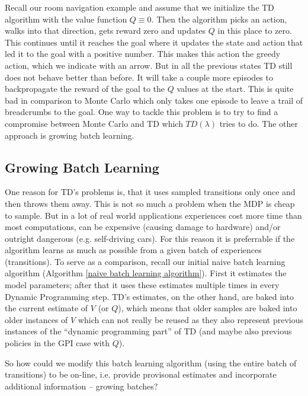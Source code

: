  Recall our room navigation example and assume that we initialize the TD algorithm with the value function \({Q\equiv 0}\). Then the algorithm picks an action, walks into that direction, gets reward zero and updates \(Q\) in this place to zero. This continues until it reaches the goal where it updates the state and action that led it to the goal with a positive number. This makes this action the greedy action, which we indicate with an arrow. But in all the previous states TD still does not behave better than before. It will take a couple more episodes to backpropagate the reward of the goal to the \(Q\) values at the start. This is quite bad in comparison to Monte Carlo which only takes one episode to leave a trail of breadcrumbs to the goal. One way to tackle this problem is to try to find a compromise between Monte Carlo and TD which \(TD(\lambda)\) tries to do. The other approach is growing batch learning. 


\subsection{Growing Batch Learning}\label{growing batch learning} 
One reason for TD's problems is, that it uses sampled transitions only once and then throws them away. This is not so much a problem when the MDP is cheap to sample. But in a lot of real world applications experiences cost more time than most computations, can be expensive (causing damage to hardware) and/or outright dangerous (e.g. self-driving cars). For this reason it is preferrable if the algorithm learns as much as possible from a given batch of experiences (transitions). To serve as a comparison, recall our initial naive batch learning algorithm (Algorithm \ref{naive batch learning algorithm}). First it estimates the model parameters; after that it uses these estimates multiple times in every Dynamic Programming step. TD's estimates, on the other hand, are baked into the current estimate of \(V\) (or \(Q\)), which means that older samples are baked into older instances of \(V\) which can not really be reused as they also represent previous instances of the ``dynamic programming part'' of TD (and maybe also previous policies in the GPI case with \(Q\)).

So how could we modify this batch learning algorithm (using the entire batch of transitions) to be on-line, i.e. provide provisonal estimates and incorporate additional information -- growing batches?

